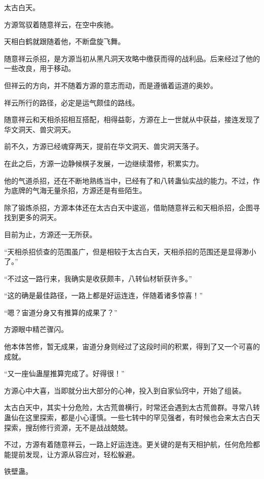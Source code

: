 
\begin{this_body}

太古白天。

方源驾驭着随意祥云，在空中疾驰。

天相白鹤就跟随着他，不断盘旋飞舞。

随意祥云杀招，是方源当初从黑凡洞天攻略中缴获而得的战利品。后来经过了他的一些改良，用于移动。

但祥云的方向，并不随着方源的意志而动，而是遵循着运道的奥妙。

祥云所行的路径，必定是运气颇佳的路线。

随意祥云和天相杀招相互搭配，相得益彰，方源在上一世就从中获益，接连发现了华文洞天、兽灾洞天。

前不久，方源已经魂穿两天，提前在华文洞天、兽灾洞天落子。

在此之后，方源一边静候棋子发展，一边继续潜修，积累实力。

他的气道杀招，还在不断地熟练当中，已经有了和八转蛊仙实战的能力。不过，作为底牌的气海无量杀招，方源还是有些陌生。

除了锻炼杀招，方源本体还在太古白天中逡巡，借助随意祥云和天相杀招，企图寻找到更多的洞天。

目前为止，方源还一无所获。

“天相杀招侦查的范围虽广，但是相较于太古白天，天相杀招的范围还是显得渺小了。”

“不过这一路行来，我确实是收获颇丰，八转仙材斩获许多。”

“这的确是最佳路径，一路上都是好运连连，伴随着诸多惊喜！”

“嗯？宙道分身又有推算的成果了？”

方源眼中精芒骤闪。

他本体苦修，暂无成果，宙道分身则经过了这段时间的积累，得到了又一个可喜的成就。

“又一座仙蛊屋推算完成了。好得很！”

方源心中大喜，当即就分出大部分的心神，投入到自家仙窍中，开始了组装。

太古白天中，其实十分危险，太古荒兽横行，时常还会遇到太古荒兽群。寻常八转蛊仙在这里探索，都是小心谨慎。一些七转中的罕见强者，有时候也会来太古白天探索，搜刮修行资源，无不是战战兢兢。

不过，方源有着随意祥云，一路上好运连连。更关键的是有天相护航，任何危险都能提前发现，让方源从容应对，轻松躲避。

铁壁蛊。


\end{this_body}
